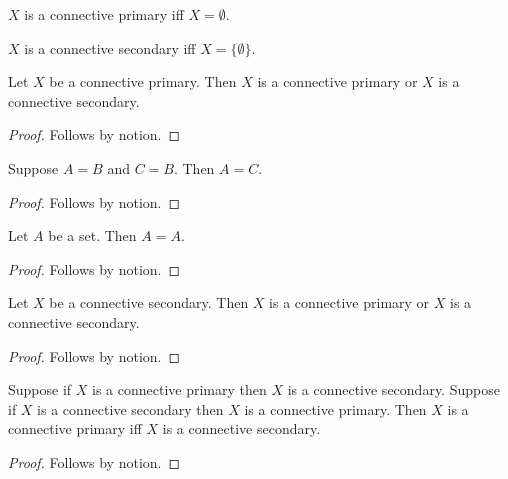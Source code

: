 \begin{definition}\label{horn_connective_primary}
    $X$ is a connective primary iff $X=\emptyset$.
\end{definition}

\begin{definition}\label{horn_connective_secondary}
    $X$ is a connective secondary iff $X=\{\emptyset\}$.
\end{definition}

\begin{proposition}\label{horn_connective_left}
    Let $X$ be a connective primary.
    Then $X$ is a connective primary or $X$ is a connective secondary.
\end{proposition}
\begin{proof}
    Follows by notion.
\end{proof}

\begin{proposition}\label{horn_connective_equality_chain}
    Suppose $A=B$ and $C=B$.
    Then $A=C$.
\end{proposition}
\begin{proof}
    Follows by notion.
\end{proof}

\begin{proposition}\label{horn_connective_equality_reflexive}
    Let $A$ be a set.
    Then $A=A$.
\end{proposition}
\begin{proof}
    Follows by notion.
\end{proof}

\begin{proposition}\label{horn_connective_right}
    Let $X$ be a connective secondary.
    Then $X$ is a connective primary or $X$ is a connective secondary.
\end{proposition}
\begin{proof}
    Follows by notion.
\end{proof}

\begin{proposition}\label{horn_connective_iff_introduction}
    Suppose if $X$ is a connective primary then $X$ is a connective secondary.
    Suppose if $X$ is a connective secondary then $X$ is a connective primary.
    Then $X$ is a connective primary iff $X$ is a connective secondary.
\end{proposition}
\begin{proof}
    Follows by notion.
\end{proof}

